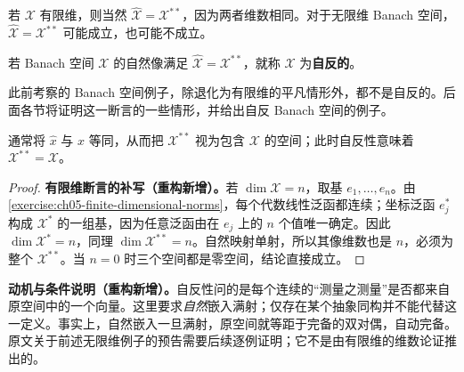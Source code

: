 \documentclass[../../main.tex]{subfiles}
\begin{document}
若 $\mathcal X$ 有限维，则当然 $\widehat{\mathcal X}=\mathcal X^{**}$，因为两者维数相同。对于无限维 Banach 空间，$\widehat{\mathcal X}=\mathcal X^{**}$ 可能成立，也可能不成立。
\begin{definition}[自反空间]\label{definition:ch05-reflexive-space}
若 Banach 空间 $\mathcal X$ 的自然像满足 $\widehat{\mathcal X}=\mathcal X^{**}$，就称 $\mathcal X$ 为\textbf{自反的}。
\end{definition}
此前考察的 Banach 空间例子，除退化为有限维的平凡情形外，都不是自反的。后面各节将证明这一断言的一些情形，并给出自反 Banach 空间的例子。

通常将 $\widehat x$ 与 $x$ 等同，从而把 $\mathcal X^{**}$ 视为包含 $\mathcal X$ 的空间；此时自反性意味着 $\mathcal X^{**}=\mathcal X$。
\begin{proof}
\textbf{有限维断言的补写（重构新增）。}若 $\dim\mathcal X=n$，取基 $e_1,\ldots,e_n$。由\cref{exercise:ch05-finite-dimensional-norms}，每个代数线性泛函都连续；坐标泛函 $e_j^*$ 构成 $\mathcal X^*$ 的一组基，因为任意泛函由在 $e_j$ 上的 $n$ 个值唯一确定。因此 $\dim\mathcal X^*=n$，同理 $\dim\mathcal X^{**}=n$。自然映射单射，所以其像维数也是 $n$，必须为整个 $\mathcal X^{**}$。当 $n=0$ 时三个空间都是零空间，结论直接成立。
\end{proof}
\begin{remark}
\textbf{动机与条件说明（重构新增）。}自反性问的是每个连续的“测量之测量”是否都来自原空间中的一个向量。这里要求\emph{自然}嵌入满射；仅存在某个抽象同构并不能代替这一定义。事实上，自然嵌入一旦满射，原空间就等距于完备的双对偶，自动完备。原文关于前述无限维例子的预告需要后续逐例证明；它不是由有限维的维数论证推出的。
\end{remark}

\end{document}
